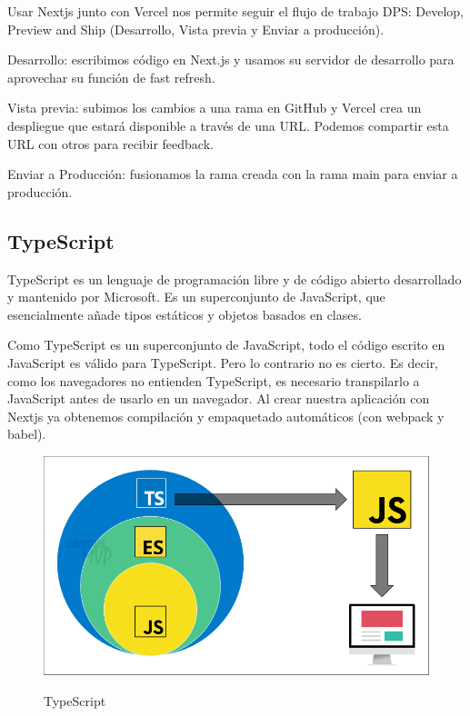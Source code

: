 \documentclass[12pt,twoside,titlepage]{report}
\begin{document}
Usar Nextjs junto con Vercel nos permite seguir el flujo de trabajo DPS: Develop, Preview and Ship (Desarrollo, Vista previa y Enviar a producción).

\begin{compactitem}
    \item Desarrollo: escribimos código en Next.js y usamos su servidor de desarrollo para aprovechar su función de fast refresh.
    \item Vista previa: subimos los cambios a una rama en GitHub y Vercel crea un despliegue que estará disponible a través de una URL. Podemos compartir esta URL con otros para recibir feedback.
    \item Enviar a Producción: fusionamos la rama creada con la rama main para enviar a producción.
\end{compactitem}

\subsection{TypeScript}

TypeScript es un lenguaje de programación libre y de código abierto desarrollado y mantenido por Microsoft. Es un superconjunto de JavaScript, que esencialmente añade tipos estáticos y objetos basados en clases.

Como TypeScript es un superconjunto de JavaScript, todo el código escrito en JavaScript es válido para TypeScript. Pero lo contrario no es cierto. Es decir, como los navegadores no entienden TypeScript, es necesario transpilarlo a JavaScript antes de usarlo en un navegador. Al crear nuestra aplicación con Nextjs ya obtenemos compilación y empaquetado automáticos (con webpack y babel).

\begin{figure}[H]
    \centering
    \includegraphics[scale=0.4]{TypeScript/TypeScript}
    \label{fig:TypeScript}
    \caption{TypeScript}
\end{figure}
\end{document}
